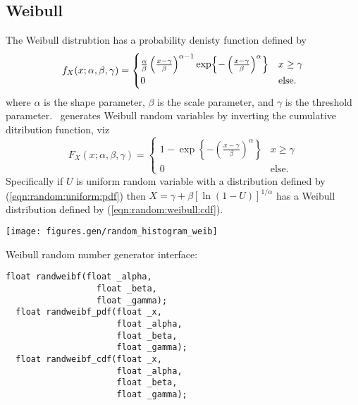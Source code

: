 \subsection{Weibull}
\label{module:random:weibull}
The Weibull distrubtion has a probability denisty function defined by
%
\begin{equation}
\label{eqn:random:weibull:pdf}
    f_X(x;\alpha,\beta,\gamma) =
    \begin{cases}
        \frac{\alpha}{\beta}
        \left(
            \frac{x-\gamma}{\beta}
        \right)^{\alpha-1}
        \exp\Bigl\{
            -\left( \frac{x-\gamma}{\beta} \right)^\alpha
        \Bigr\}                         & \text{$x \ge \gamma$} \\
        0                               & \text{else}.
    \end{cases}
\end{equation}
%
where
$\alpha$ is the shape parameter,
$\beta$ is the scale parameter,
and
$\gamma$ is the threshold parameter.
%
\liquid\ generates Weibull random variables by inverting the cumulative
ditribution function, viz
%
\begin{equation}
\label{eqn:random:weibull:cdf}
    F_X(x;\alpha,\beta,\gamma) =
    \begin{cases}
        1 - \exp\left\{
            -\left(\frac{x-\gamma}{\beta}\right)^\alpha
        \right\} &                            x \ge \gamma \\
        0 &                                   \text{else}.
    \end{cases}
\end{equation}
%
Specifically if $U$ is uniform random variable with a distribution
defined by (\ref{eqn:random:uniform:pdf}) then
$X = \gamma + \beta\left[ \ln\left(1 - U\right) \right]^{1/\alpha}$
%
has a Weibull distribution defined by (\ref{eqn:random:weibull:cdf}).

\begin{minipage}{0.5\textwidth}
  \texttt{[image: figures.gen/random\_histogram\_weib]}
\end{minipage}
\begin{minipage}{0.5\textwidth}
  Weibull random number generator interface:
  \begin{Verbatim}[fontsize=\small]
  float randweibf(float _alpha,
                  float _beta,
                  float _gamma);
  float randweibf_pdf(float _x,
                      float _alpha,
                      float _beta,
                      float _gamma);
  float randweibf_cdf(float _x,
                      float _alpha,
                      float _beta,
                      float _gamma);
  \end{Verbatim}
\end{minipage}


